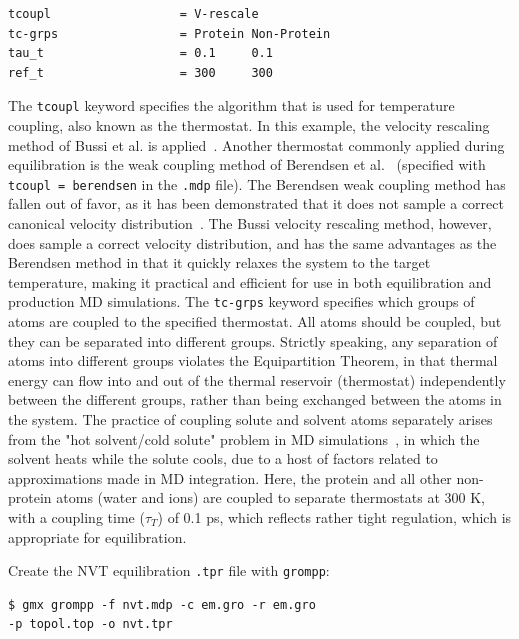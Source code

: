 \documentclass[9pt,tutorial]{livecoms}
\begin{document}
\begin{verbatim}
tcoupl                  = V-rescale
tc-grps                 = Protein Non-Protein
tau_t                   = 0.1     0.1
ref_t                   = 300     300
\end{verbatim}

The \texttt{tcoupl} keyword specifies the algorithm that is used for temperature coupling, also known as the thermostat. In this example, the velocity rescaling method of Bussi et al. is applied~\cite{Bussi2007}. Another thermostat commonly applied during equilibration is the weak coupling method of Berendsen et al.~\cite{Berendsen1984} (specified with \texttt{tcoupl = berendsen} in the \texttt{.mdp} file). The Berendsen weak coupling method has fallen out of favor, as it has been demonstrated that it does not sample a correct canonical velocity distribution~\cite{Bussi2007}. The Bussi velocity rescaling method, however, does sample a correct velocity distribution, and has the same advantages as the Berendsen method in that it quickly relaxes the system to the target temperature, making it practical and efficient for use in both equilibration and production MD simulations. The \texttt{tc-grps} keyword specifies which groups of atoms are coupled to the specified thermostat. All atoms should be coupled, but they can be separated into different groups. Strictly speaking, any separation of atoms into different groups violates the Equipartition Theorem, in that thermal energy can flow into and out of the thermal reservoir (thermostat) independently between the different groups, rather than being exchanged between the atoms in the system. The practice of coupling solute and solvent atoms separately arises from the "hot solvent/cold solute" problem in MD simulations~\cite{Lingenheil2008}, in which the solvent heats while the solute cools, due to a host of factors related to approximations made in MD integration. Here, the protein and all other non-protein atoms (water and ions) are coupled to separate thermostats at 300 K, with a coupling time ($\tau_{T}$) of 0.1 ps, which reflects rather tight regulation, which is appropriate for equilibration.

Create the NVT equilibration \texttt{.tpr} file with \texttt{grompp}:

\begin{verbatim}
$ gmx grompp -f nvt.mdp -c em.gro -r em.gro 
-p topol.top -o nvt.tpr
\end{verbatim}
\end{document}
